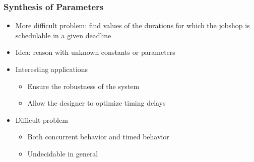 \documentclass[professionalfont]{beamer}
\newcommand{\couleur}[1]{\textcolor{couleurimportante}{#1}}
\begin{document}
\begin{frame}
\frametitle{Synthesis of Parameters}

\begin{itemize}
	\item More difficult problem: \couleur{find values of the durations} for which the jobshop is schedulable in a given deadline

	\bigskip

	\item Idea: reason with unknown constants or \couleur{parameters}
	
	\bigskip

	\item Interesting applications
	\begin{itemize}
		\item Ensure the \couleur{robustness} of the system
		\item Allow the designer to \couleur{optimize} timing delays
	\end{itemize}

	
	\bigskip


	\item Difficult problem
	\begin{itemize}
		\item Both concurrent behavior and timed behavior
		\item Undecidable in general
	\end{itemize}

\end{itemize}

\end{frame}

% 
% 
\end{document}
